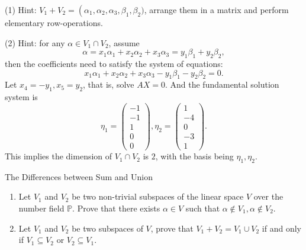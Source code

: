 \begin{solution}
  (1) Hint: $V_1 + V_2 = \operatorname(\alpha_1, \alpha_2, \alpha_3, \beta_1,
  \beta_2)$,
  arrange them in a matrix and perform elementary row-operations.

  (2) Hint: for any $\alpha \in V_1 \cap V_2$,
  assume
  \begin{equation}
    \alpha = x_1 \alpha_1 + x_2 \alpha_2 + x_3 \alpha_3 = y_1 \beta_1 + y_2 \beta_2,
  \end{equation}
  then the coefficients need to satisfy the system of equations:
  \begin{equation}
    x_1 \alpha_1 + x_2 \alpha_2 + x_3 \alpha_3 - y_1 \beta_1 - y_2 \beta_2 = 0.
  \end{equation}
  Let $x_4 = -y_1, x_5 = y_2$, that is, solve $AX = 0$.
  And the fundamental solution system is
  \begin{equation}
    \left.\eta_1=\left(\begin{array}{c}-1\\-1\\1\\0\\0\end{array}\right.\right),\eta_2=\left( \begin{array}{c}1\\-4\\0\\-3\\1\end{array} \right).
  \end{equation}
  This implies the dimension of $V_1 \cap V_2$ is $2$,
  with the basis being $\eta_1, \eta_2$.
\end{solution}

\begin{example}{The Differences between Sum and Union}{}
  \begin{enumerate}
  \item Let $V_1$ and $V_2$ be two non-trivial subspaces of the linear space $V$ over
    the number field $\mathbb{P}$. Prove that there exists $\alpha \in V$ such that
    $\alpha \not\in V_1, \alpha \not \in V_2$.
  \item Let $V_1$ and $V_2$ be two subspaces of $V$,
    prove that $V_1 + V_2 = V_1 \cup V_2$ if and only if $V_1 \subseteq V_2$ or
    $V_2 \subseteq V_1$.
  \end{enumerate}
\end{example}


